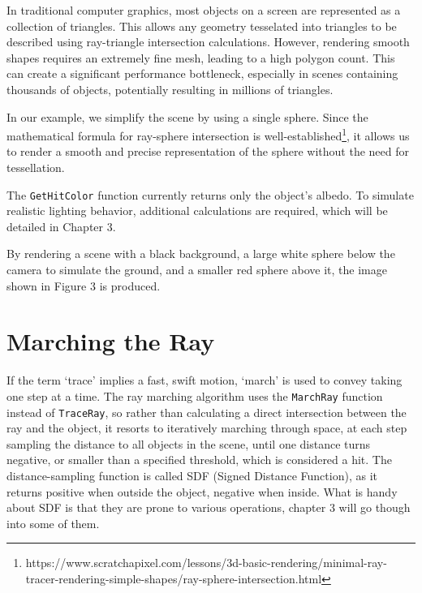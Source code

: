 In traditional computer graphics, most objects on a screen are represented as a collection of triangles. This allows any geometry tesselated into triangles to be described using ray-triangle intersection calculations. However, rendering smooth shapes requires an extremely fine mesh, leading to a high polygon count. This can create a significant performance bottleneck, especially in scenes containing thousands of objects, potentially resulting in millions of triangles.

In our example, we simplify the scene by using a single sphere. Since the mathematical formula for ray-sphere intersection is well-established\footnote{https://www.scratchapixel.com/lessons/3d-basic-rendering/minimal-ray-tracer-rendering-simple-shapes/ray-sphere-intersection.html}, it allows us to render a smooth and precise representation of the sphere without the need for tessellation.

The \texttt{GetHitColor} function currently returns only the object's albedo. To simulate realistic lighting behavior, additional calculations are required, which will be detailed in Chapter 3.

By rendering a scene with a black background, a large white sphere below the camera to simulate the ground, and a smaller red sphere above it, the image shown in Figure 3 is produced.



\section{Marching the Ray}

If the term `trace' implies a fast, swift motion, `march' is used to convey taking one step at a time. The ray marching algorithm uses the \texttt{MarchRay} function instead of \texttt{TraceRay}, so rather than calculating a direct intersection between the ray and the object, it resorts to iteratively marching through space, at each step sampling the distance to all objects in the scene, until one distance turns negative, or smaller than a specified threshold, which is considered a hit. The distance-sampling function is called SDF (Signed Distance Function), as it returns positive when outside the object, negative when inside. What is handy about SDF is that they are prone to various operations, chapter 3 will go though into some of them. 

